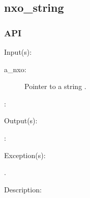 %
%
%
%
%              

\subsection{nxo\_string}
\label{nxo_string}

\subsubsection{API}
\begin{capi}
\label{nxo_string_}
	\begin{capilist}
	\item[Input(s): ]
		\begin{description}\item[]
		\item[a\_nxo: ]
			Pointer to a string .
		\item[: ]
		\end{description}
	\item[Output(s): ]
		\begin{description}\item[]
		\item[: ]
		\end{description}
	\item[Exception(s): ]
		\begin{description}\item[]
		\item[.]
		\end{description}
	\item[Description: ]
	\end{capilist}
\end{capi}
